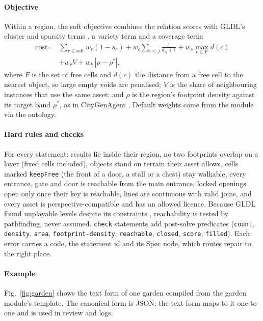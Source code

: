 \documentclass[conference]{IEEEtran}
\begin{document}
\paragraph{Objective} Within a region, the soft objective combines the relation scores
with GLDL's cluster and sparsity terms \cite{gldl}, a variety term and a coverage term:
\begin{equation}
\begin{aligned}
\text{cost} = &\textstyle\sum_{r \in \text{soft}} w_r (1 - s_r)
  + w_c \sum_{i<j} \frac{1}{d_{ij} + 1}
  + w_s \max_{c \in F} d(c) \\
 &+ w_v V + w_k \,|\rho - \rho^{*}|,
\end{aligned}
\end{equation}
where $F$ is the set of free cells and $d(c)$ the distance from a free cell to the
nearest object, so large empty voids are penalised; $V$ is the share of neighbouring
instances that use the same asset; and $\rho$ is the region's footprint density against
its target band $\rho^{*}$, as in CityGenAgent \cite{citygenagent}. Default weights come
from the module via the ontology.

\paragraph{Hard rules and checks} For every statement: results lie inside their region,
no two footprints overlap on a layer (fixed cells included), objects stand on terrain
their asset allows, cells marked \texttt{keepFree} (the front of a door, a stall or a
chest) stay walkable, every entrance, gate and door is reachable from the main entrance,
locked openings open only once their key is reachable, lines are continuous with valid
joins, and every asset is perspective-compatible and has an allowed licence. Because GLDL
found unplayable levels despite its constraints \cite{gldl}, reachability is tested by
pathfinding, never assumed. \texttt{check} statements add post-solve predicates
(\texttt{count}, \texttt{density}, \texttt{area}, \texttt{footprint-density},
\texttt{reachable}, \texttt{closed}, \texttt{score}, \texttt{filled}). Each error carries
a code, the statement id and its Spec node, which routes repair to the right place.

\paragraph{Example} Fig.~\ref{fig:garden} shows the text form of one garden compiled
from the garden module's template. The canonical form is JSON; the text form maps to it
one-to-one and is used in review and logs.
\end{document}
